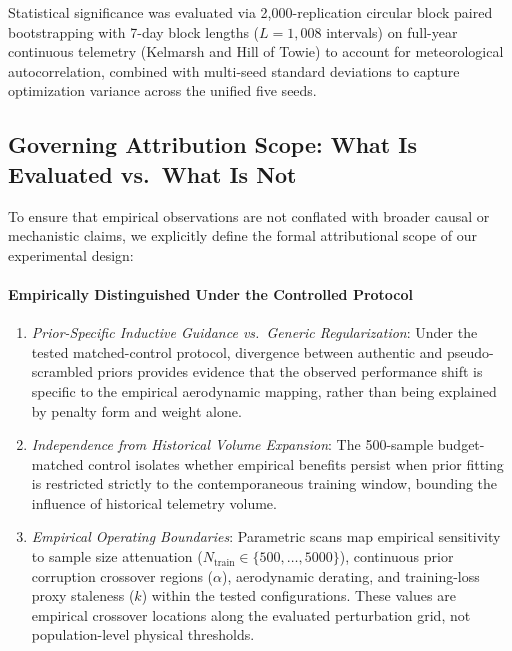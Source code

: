 Statistical significance was evaluated via 2,000-replication circular block paired bootstrapping with 7-day block lengths ($L=1,008$ intervals) on full-year continuous telemetry (Kelmarsh and Hill of Towie) to account for meteorological autocorrelation, combined with multi-seed standard deviations to capture optimization variance across the unified five seeds.

\subsection{Governing Attribution Scope: What Is Evaluated vs.\ What Is Not}
\label{subsec:governing_identification}
To ensure that empirical observations are not conflated with broader causal or mechanistic claims, we explicitly define the formal attributional scope of our experimental design:

\paragraph{Empirically Distinguished Under the Controlled Protocol}
\begin{enumerate}[leftmargin=*, label=(\alph*)]
\item \textit{Prior-Specific Inductive Guidance vs.\ Generic Regularization}: Under the tested matched-control protocol, divergence between authentic and pseudo-scrambled priors provides evidence that the observed performance shift is specific to the empirical aerodynamic mapping, rather than being explained by penalty form and weight alone.
\item \textit{Independence from Historical Volume Expansion}: The 500-sample budget-matched control isolates whether empirical benefits persist when prior fitting is restricted strictly to the contemporaneous training window, bounding the influence of historical telemetry volume.
\item \textit{Empirical Operating Boundaries}: Parametric scans map empirical sensitivity to sample size attenuation ($N_{\text{train}} \in \{500, \dots, 5000\}$), continuous prior corruption crossover regions ($\alpha$), aerodynamic derating, and training-loss proxy staleness ($k$) within the tested configurations. These values are empirical crossover locations along the evaluated perturbation grid, not population-level physical thresholds.
\end{enumerate}

